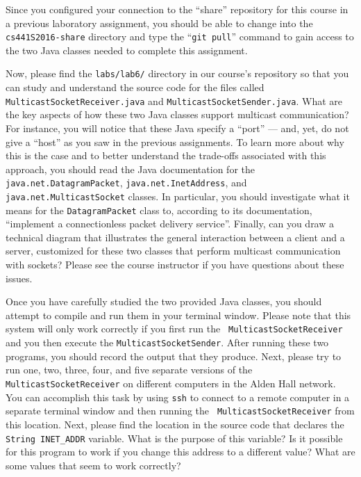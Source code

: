 Since you configured your connection to the ``share'' repository for this course in a previous laboratory assignment,
you should be able to change into the {\tt cs441S2016-share} directory and type the ``{\tt git pull}'' command to gain
access to the two Java classes needed to complete this assignment.

\begin{sloppypar}
  Now, please find the {\tt labs/lab6/} directory in our course's repository so that you can study and understand the
  source code for the files called {\tt MulticastSocketReceiver.java} and {\tt MulticastSocketSender.java}. What are the
  key aspects of how these two Java classes support multicast communication? For instance, you will notice that these
  Java specify a ``port'' --- and, yet, do not give a ``host'' as you saw in the previous assignments. To learn more
  about why this is the case and to better understand the trade-offs associated with this approach, you should read the
  Java documentation for the {\tt java.net.DatagramPacket}, {\tt java.net.InetAddress}, and {\tt
  java.net.MulticastSocket} classes. In particular, you should investigate what it means for the {\tt DatagramPacket}
  class to, according to its documentation, ``implement a connectionless packet delivery service''.  Finally, can you
  draw a technical diagram that illustrates the general interaction between a client and a server, customized for these
  two classes that perform multicast communication with sockets? Please see the course instructor if you have
  questions about these issues.
\end{sloppypar}

Once you have carefully studied the two provided Java classes, you should attempt to compile and run them in your
terminal window. Please note that this system will only work correctly if you first run the {\tt
MulticastSocketReceiver} and you then execute the {\tt MulticastSocketSender}. After running these two programs, you
should record the output that they produce. Next, please try to run one, two, three, four, and five separate versions of
the {\tt MulticastSocketReceiver} on different computers in the Alden Hall network. You can accomplish this task by
using {\tt ssh} to connect to a remote computer in a separate terminal window and then running the {\tt
  MulticastSocketReceiver} from this location. Next, please find the location in the source code that declares the {\tt
String INET\_ADDR} variable. What is the purpose of this variable? Is it possible for this program to work if you change
this address to a different value? What are some values that seem to work correctly?

